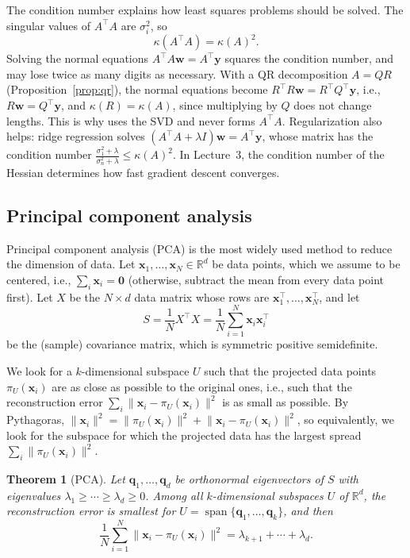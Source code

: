 \documentclass[11pt]{article}
\newcommand{\py}[1]{\texttt{\detokenize{#1}}}
\newcommand{\norm}[1]{\lVert #1 \rVert}
\theoremstyle{definition}
\theoremstyle{plain}
\newtheorem{theorem}[definition]{Theorem}
\theoremstyle{remark}
\DeclareMathOperator{\Span}{span}
\begin{document}
The condition number explains how least squares problems should be solved. The singular values of $A^\top A$ are $\sigma_i^2$, so
\[\kappa(A^\top A) = \kappa(A)^2.\]
Solving the normal equations $A^\top A\mathbf{w} = A^\top\mathbf{y}$ squares the condition number, and may lose twice as many digits as necessary. With a QR decomposition $A = QR$ (Proposition~\ref{prop:qr}), the normal equations become $R^\top R\mathbf{w} = R^\top Q^\top\mathbf{y}$, i.e., $R\mathbf{w} = Q^\top\mathbf{y}$, and $\kappa(R) = \kappa(A)$, since multiplying by $Q$ does not change lengths. This is why \py{np.linalg.lstsq} uses the SVD and never forms $A^\top A$. Regularization also helps: ridge regression solves $(A^\top A + \lambda I)\mathbf{w} = A^\top\mathbf{y}$, whose matrix has the condition number $\frac{\sigma_1^2 + \lambda}{\sigma_n^2 + \lambda} \leq \kappa(A)^2$. In Lecture~3, the condition number of the Hessian determines how fast gradient descent converges.

\subsection{Principal component analysis}\label{sec:pca}

Principal component analysis (PCA) is the most widely used method to reduce the dimension of data. Let $\mathbf{x}_1, \ldots, \mathbf{x}_N \in \mathbb{R}^d$ be data points, which we assume to be centered, i.e., $\sum_i \mathbf{x}_i = \mathbf{0}$ (otherwise, subtract the mean from every data point first). Let $X$ be the $N \times d$ data matrix whose rows are $\mathbf{x}_1^\top, \ldots, \mathbf{x}_N^\top$, and let
\[S = \frac{1}{N} X^\top X = \frac{1}{N} \sum_{i=1}^N \mathbf{x}_i \mathbf{x}_i^\top\]
be the (sample) covariance matrix, which is symmetric positive semidefinite.

We look for a $k$-dimensional subspace $U$ such that the projected data points $\pi_U(\mathbf{x}_i)$ are as close as possible to the original ones, i.e., such that the reconstruction error $\sum_i \norm{\mathbf{x}_i - \pi_U(\mathbf{x}_i)}^2$ is as small as possible. By Pythagoras, $\norm{\mathbf{x}_i}^2 = \norm{\pi_U(\mathbf{x}_i)}^2 + \norm{\mathbf{x}_i - \pi_U(\mathbf{x}_i)}^2$, so equivalently, we look for the subspace for which the projected data has the largest spread $\sum_i \norm{\pi_U(\mathbf{x}_i)}^2$.

\begin{theorem}[PCA]\label{thm:pca}
    Let $\mathbf{q}_1, \ldots, \mathbf{q}_d$ be orthonormal eigenvectors of $S$ with eigenvalues $\lambda_1 \geq \cdots \geq \lambda_d \geq 0$. Among all $k$-dimensional subspaces $U$ of $\mathbb{R}^d$, the reconstruction error is smallest for $U = \Span\{\mathbf{q}_1, \ldots, \mathbf{q}_k\}$, and then
    \[\frac{1}{N}\sum_{i=1}^N \norm{\mathbf{x}_i - \pi_U(\mathbf{x}_i)}^2 = \lambda_{k+1} + \cdots + \lambda_d.\]
\end{theorem}
\end{document}
